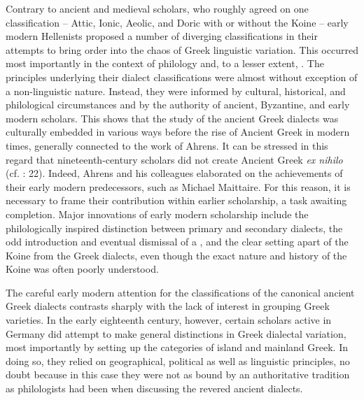Contrary to ancient and medieval scholars, who roughly agreed on one classification – Attic, Ionic, Aeolic, and Doric with or without the Koine – early modern Hellenists proposed a number of diverging classifications in their attempts to bring order into the chaos of Greek linguistic variation. This occurred most importantly in the context of philology and, to a lesser extent, . The principles underlying their dialect classifications were almost without exception of a non-linguistic nature. Instead, they were informed by cultural, historical, and philological circumstances and by the authority of ancient, Byzantine, and early modern scholars. This shows that the study of the ancient Greek dialects was culturally embedded in various ways before the rise of Ancient Greek  in modern times, generally connected to the work of Ahrens. It can be stressed in this regard that nineteenth-century scholars did not create Ancient Greek  \textit{ex nihilo} (cf. \citealt{Colvin2007}: 22). Indeed, Ahrens and his colleagues elaborated on the achievements of their early modern predecessors, such as Michael Maittaire. For this reason, it is necessary to frame their contribution within earlier scholarship, a task awaiting completion. Major innovations of early modern scholarship include the philologically inspired distinction between primary and secondary dialects, the odd introduction and eventual dismissal of a , and the clear setting apart of the Koine from the Greek dialects, even though the exact nature and history of the Koine was often poorly understood.

The careful early modern attention for the classifications of the canonical ancient Greek dialects contrasts sharply with the lack of interest in grouping  Greek varieties. In the early eighteenth century, however, certain scholars active in Germany did attempt to make general distinctions in  Greek dialectal variation, most importantly by setting up the categories of island and mainland Greek. In doing so, they relied on geographical, political as well as linguistic principles, no doubt because in this case they were not as bound by an authoritative tradition as philologists had been when discussing the revered ancient dialects.


